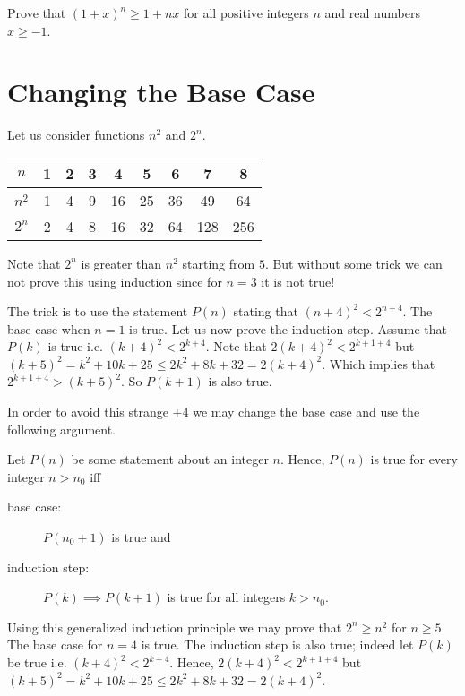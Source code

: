\begin{exercise}
  Prove that $(1 + x)^n \ge 1 + nx$ for all positive integers $n$ and real
  numbers $x \ge -1$.
\end{exercise}

\section{Changing the Base Case}
Let us consider functions $n^2$ and $2^n$.

\begin{center}
  \begin{tabular}{c | c | c | c | c | c | c | c | c}
    $n$   & 1 & 2 & 3 & 4  & 5  & 6  & 7   & 8   \\
    \hline
    $n^2$ & 1 & 4 & 9 & 16 & 25 & 36 & 49  & 64  \\
    $2^n$ & 2 & 4 & 8 & 16 & 32 & 64 & 128 & 256
  \end{tabular}
\end{center}
Note that $2^n$ is greater than $n^2$ starting from $5$. But without some trick
we can not prove this using induction since for $n = 3$ it is not true!

The trick is to use the statement $P(n)$ stating that $(n + 4)^2 < 2^{n + 4}$.
The base case when $n = 1$ is true.
Let us now prove the induction step. Assume that $P(k)$ is true i.e.
$(k + 4)^2 < 2^{k + 4}$. Note that $2(k + 4)^2 < 2^{k + 1 + 4}$ but
$(k + 5)^2 = k^2 + 10k + 25 \le 2k^2 + 8k + 32 = 2(k + 4)^2$. Which implies that
$2^{k + 1 + 4} > (k + 5)^2$. So $P(k + 1)$ is also true.

In order to avoid this strange $+4$ we may change the base
case and use the following argument.

\begin{theorem}
\label{theorem:induction-shifted-base}
  Let $P(n)$ be some statement about an integer $n$.
  Hence, $P(n)$ is true for every integer $n > n_0$ iff
  \begin{description}
    \item[base case:] $P(n_0 + 1)$ is true and
    \item[induction step:] $P(k) \implies P(k + 1)$ is true for all
      integers $k > n_0$.
  \end{description}
\end{theorem}

Using this generalized induction principle we may prove that $2^n \ge n^2$ for
$n \ge 5$. The base case for $n = 4$ is true. The induction step is also true;
indeed let $P(k)$ be true i.e. $(k + 4)^2 < 2^{k + 4}$. Hence,
$2(k + 4)^2 < 2^{k + 1 + 4}$ but
$(k + 5)^2 = k^2 + 10k + 25 \le 2k^2 + 8k + 32 = 2(k + 4)^2$.

